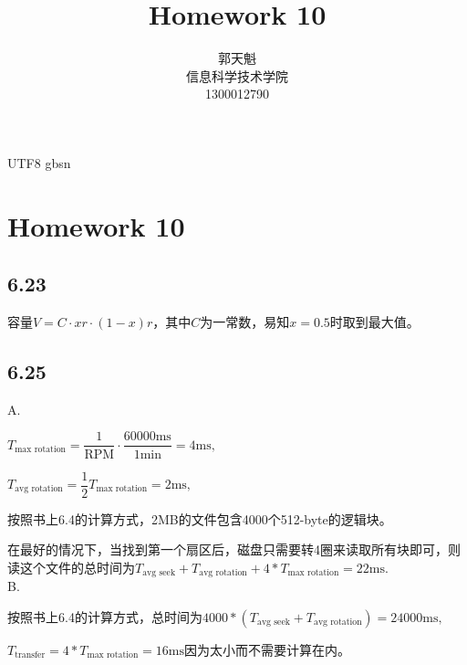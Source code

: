 \documentclass {article}
\begin{document}
  \begin {CJK*} {UTF8} {gbsn}
    \title {\textbf {\Huge Homework 10}}
		\author {郭天魁 \\ 信息科学技术学院 \\ 1300012790}

		\maketitle

		\section{Homework 10}
			\subsection{6.23}
				容量$V=C\cdot xr\cdot (1-x)r$，其中$C$为一常数，易知$x=0.5$时取到最大值。\\

			\subsection{6.25}
				A.

				$T_{\text{max rotation}}=\dfrac{1}{\text{RPM}}\cdot \dfrac{60000\text{ms}}{1\text{min}}=4\text{ms},$

				$T_{\text{avg rotation}}=\dfrac{1}{2}T_{\text{max rotation}}=2\text{ms},$

				按照书上6.4的计算方式，2MB的文件包含4000个512-byte的逻辑块。

				在最好的情况下，当找到第一个扇区后，磁盘只需要转4圈来读取所有块即可，则读这个文件的总时间为$T_{\text{avg seek}}+T_{\text{avg rotation}}+4*T_{\text{max rotation}}=22\text{ms}.$\\

				B.

				按照书上6.4的计算方式，总时间为$4000*(T_{\text{avg seek}}+T_{\text{avg rotation}})=24000\text{ms},$
			
				$T_{\text{transfer}}=4*T_{\text{max rotation}}=16\text{ms}$因为太小而不需要计算在内。\\


\end{CJK*}
\end{document}

